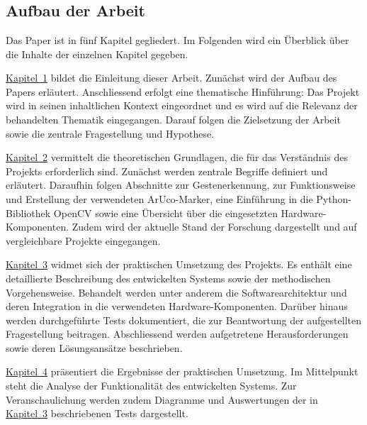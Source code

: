 \chapter{\chapOne}
\label{sec:kapitel1} %

\begingroup
\fontsize{12pt}{14pt}\selectfont

\section{Aufbau der Arbeit}
Das Paper \textit{\maTitle} ist in fünf Kapitel gegliedert.
Im Folgenden wird ein Überblick über die Inhalte der einzelnen Kapitel gegeben.

\hyperref[sec:kapitel1]{Kapitel~1} bildet die Einleitung dieser Arbeit.
Zunächst wird der Aufbau des Papers erläutert.
Anschliessend erfolgt eine thematische Hinführung: Das Projekt wird in seinen inhaltlichen Kontext eingeordnet und es wird auf die Relevanz der behandelten Thematik eingegangen.
Darauf folgen die Zielsetzung der Arbeit sowie die zentrale Fragestellung und Hypothese.

\hyperref[sec:kapitel2]{Kapitel~2} vermittelt die theoretischen Grundlagen, die für das Verständnis des Projekts erforderlich sind.
Zunächst werden zentrale Begriffe definiert und erläutert.
Daraufhin folgen Abschnitte zur Gestenerkennung, zur Funktionsweise und Erstellung der verwendeten ArUco-Marker, eine Einführung in die Python-Bibliothek OpenCV sowie eine Übersicht über die eingesetzten Hardware-Komponenten.
Zudem wird der aktuelle Stand der Forschung dargestellt und auf vergleichbare Projekte eingegangen.

\hyperref[sec:kapitel3]{Kapitel~3} widmet sich der praktischen Umsetzung des Projekts.
Es enthält eine detaillierte Beschreibung des entwickelten Systems sowie der methodischen Vorgehensweise.
Behandelt werden unter anderem die Softwarearchitektur und deren Integration in die verwendeten Hardware-Komponenten.
Darüber hinaus werden durchgeführte Tests dokumentiert, die zur Beantwortung der aufgestellten Fragestellung beitragen.
Abschliessend werden aufgetretene Herausforderungen sowie deren Lösungsansätze beschrieben.

\hyperref[sec:kapitel4]{Kapitel~4} präsentiert die Ergebnisse der praktischen Umsetzung.
Im Mittelpunkt steht die Analyse der Funktionalität des entwickelten Systems.
Zur Veranschaulichung werden zudem Diagramme und Auswertungen der in \hyperref[sec:kapitel3]{Kapitel~3} beschriebenen Tests dargestellt.

